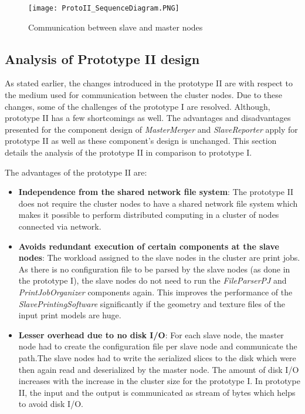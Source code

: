\begin{figure}[!t]
\centering
\texttt{[image: ProtoII\_SequenceDiagram.PNG]}
\caption{Communication between slave and master nodes}
\label{fig:ProtoII}
\end{figure}

\subsection{Analysis of Prototype II design}

As stated earlier, the changes introduced in the prototype II are with respect to the medium used for communication between the cluster nodes. Due to these changes, some of the challenges of the prototype I are resolved. Although, prototype II has a few shortcomings as well. The advantages and disadvantages presented for the component design of \textit{MasterMerger} and \textit{SlaveReporter} apply for prototype II as well as these component's design is unchanged. This section details the analysis of the  prototype II in comparison to prototype I. 

The advantages of the prototype II are:
\begin{itemize}
\item \textbf{Independence from the shared network file system}: The prototype II does not require the cluster nodes to have a shared network file system which makes it possible to perform distributed computing in a cluster of nodes connected via network. 
\item \textbf{Avoids redundant execution of certain components at the slave nodes}: The workload assigned to the slave nodes in the cluster are print jobs. As there is no configuration file to be parsed by the slave nodes (as done in the prototype I), the slave nodes do not need to run the \textit{FileParserPJ} and \textit{PrintJobOrganizer} components again. This improves the performance of the \textit{SlavePrintingSoftware} significantly if the geometry and texture files of the input print models are huge.   
\item \textbf{Lesser overhead due to no disk I/O}: For each slave node, the master node had to create the configuration file per slave node and communicate the path.The slave nodes had to write the serialized slices to the disk which were then again read and deserialized by the master node. The amount of disk I/O increases with the increase in the cluster size for the prototype I. In prototype II, the input and the output is communicated as stream of bytes which helps to avoid disk I/O.
\end{itemize}

